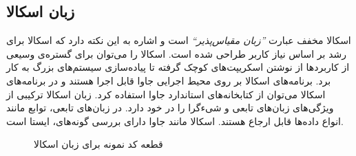 \subsection{زبان اسکالا}
اسکالا مخفف عبارت \emph{''زبان مقیاس‌پذیر``} است و اشاره به این نکته دارد که اسکالا برای رشد بر اساس نیاز کاربر طراحی شده است. اسکالا را می‌توان برای گستره‌ی وسیعی از کاربردها از نوشتن اسکریپت‌های کوچک گرفته تا پیاده‌سازی سیستم‌های بزرگ به کار برد. برنامه‌های اسکالا بر روی محیط اجرایی جاوا  قابل اجرا هستند و در برنامه‌های اسکالا  می‌توان از کتابخانه‌های استاندارد جاوا استفاده کرد.
زبان اسکالا ترکیبی از ویژگی‌های زبان‌های \gls{تابعی} و شیءگرا را در خود دارد. در زبان‌های تابعی، توابع مانند انواع داده‌ها قابل ارجاع هستند. اسکالا مانند جاوا دارای \gls{بررسی گونه‌ها}ی، \gls{ایستا} است.
\begin{figure}[ht]
\begin{latin}
\linespread{1.1}

\linespread{1.3}
\end{latin}

\caption{قطعه کد نمونه برای زبان اسکالا}
\label{figure:scalaSample}
\end{figure}


